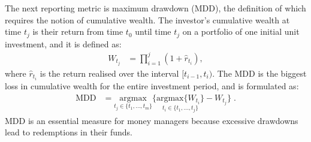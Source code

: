 \documentclass[
]{article}
\begin{document}
The next reporting metric is maximum drawdown (MDD), the definition of which requires the notion of
cumulative wealth. The investor's cumulative wealth at time \(t_j\) is their return from time \(t_0\)
until time \(t_j\) on a portfolio of one initial unit investment, and it is defined as:
\begin{align*}
W_{t_j} &= \prod_{i = 1}^{j} (1 + \hat{r}_{t_i}), 
\end{align*}
where \(\hat{r}_{t_i}\) is the return realised over the interval \([t_{i - 1}, t_i)\). The MDD is the
biggest loss in cumulative wealth for the entire investment period, and is formulated as:
\begin{align}
\text{MDD} & = \underset{t_j \in \{t_1, ..., t_m\}}{\text{argmax}} \Big \{ \underset{t_i \in \{t_1, \text{...}, t_j\}}{\text{argmax} \{W_{t_i} \}} - W_{t_j}  \Big \} \; .
\end{align}
MDD is an essential measure for money managers because excessive drawdowns lead to redemptions in
their funds. \citep{M04}
\end{document}

